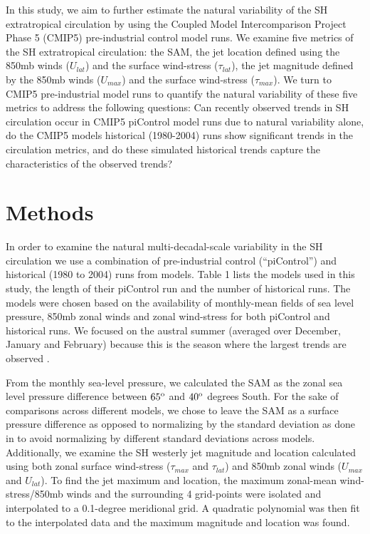 In this study, we aim to further estimate the natural variability of the SH
extratropical circulation by using the Coupled Model Intercomparison Project
Phase 5 (CMIP5) pre-industrial control model runs. We examine five metrics of
the SH extratropical circulation: the SAM, the jet location defined using the
850mb winds ($U_{lat}$) and the surface wind-stress ($\tau_{lat}$), the jet
magnitude defined by the 850mb winds ($U_{max}$) and the surface wind-stress
($\tau_{max}$). We turn to CMIP5 pre-industrial model runs to quantify the
natural variability of these five metrics to address the following questions:
Can recently observed trends in SH circulation occur in CMIP5 piControl model
runs due to natural variability alone, do the CMIP5 models historical
(1980-2004) runs show significant trends in the circulation metrics, and do
these simulated historical trends capture the characteristics of the observed
trends?

\section{Methods}


In order to examine the natural multi-decadal-scale variability in the SH
circulation we use a combination of pre-industrial control (``piControl'') and
historical (1980 to 2004) runs from models. Table 1 lists the models used in
this study, the length of their piControl run and the number of historical runs.
The models were chosen based on the availability of monthly-mean fields of sea
level pressure, 850mb zonal winds and zonal wind-stress for both piControl and
historical runs.  We focused on the austral summer (averaged over December,
January and February) because this is the season where the largest trends are
observed \citep{Thompson2002e,Thompson2011}.

From the monthly sea-level pressure, we calculated the SAM as the zonal sea
level pressure difference between $65^{\rm o}$ and $40^{\rm o}$ degrees South.
For the sake of comparisons across different models, we chose to leave the SAM
as a surface pressure difference as opposed to normalizing by the standard
deviation as done in \citet{Gong1999} to avoid normalizing by different
standard deviations across models. Additionally, we examine the SH  westerly
jet magnitude and location calculated using both zonal surface wind-stress
($\tau_{max}$ and $\tau_{lat}$) and 850mb zonal winds ($U_{max}$ and $U_{lat}$).
To find the jet maximum and location, the maximum zonal-mean wind-stress/850mb
winds and the surrounding 4 grid-points were isolated and interpolated to a
0.1-degree meridional grid. A quadratic polynomial was then fit to the
interpolated data and the maximum magnitude and location was found.

